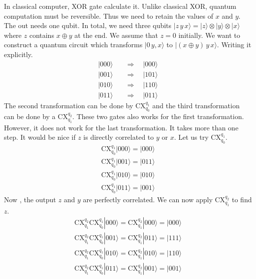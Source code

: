 \documentclass[letterpaper,10pt,english]{jupyterBook}
\begin{document}
\sphinxAtStartPar
In classical computer, XOR gate calculate it. Unlike classical XOR, quantum computation must be reversible.  Thus we need to retain the values of \(x\) and \(y\). The out needs one qubit.  In total, we need three qubits
\(|z\,y\,x\rangle = |z\rangle \otimes |y\rangle \otimes |x\rangle\) where \(z\) contains \(x \oplus y\) at the end.  We assume that \(z=0\) initially.  We want to construct a quantum circuit which transforms \(|0\,y,x\rangle\) to \(|(x \oplus y)\, y\, x\rangle\).  Writing it explicitly.
\begin{align}
|000\rangle \quad &\Rightarrow \quad |000\rangle \\
|001\rangle \quad &\Rightarrow \quad |101\rangle \\
|010\rangle \quad &\Rightarrow \quad |110\rangle \\
|011\rangle \quad &\Rightarrow \quad |011\rangle
\end{align}
\sphinxAtStartPar
The second transformation can be done by CX\(_{q_0}^{q_1}\) and the third transformation can be done by a CX\(_{q_1}^{q_2}\). These two gates also works for the first transformation.  However, it does not work for the last transformation.  It takes more than one step.  It would be nice if \(z\) is directly correlated to \(y\) or \(x\). Let us try CX\(_{q_0}^{q_1}\).
\begin{align}
\text{CX}_{q_0}^{q_1}|000\rangle = |000\rangle \\
\text{CX}_{q_0}^{q_1}|001\rangle = |011\rangle \\
\text{CX}_{q_0}^{q_1}|010\rangle = |010\rangle \\
\text{CX}_{q_0}^{q_1}|011\rangle = |001\rangle
\end{align}
\sphinxAtStartPar
Now , the output \(z\) and \(y\) are perfectly correlated.  We can now apply CX\(_{q_1}^{q_2}\) to find \(z\).
\begin{align}
\text{CX}_{q_1}^{q_2}\text{CX}_{q_0}^{q_1}|000\rangle = \text{CX}_{q_1}^{q_2}|000\rangle = |000\rangle  \\
\text{CX}_{q_1}^{q_2}\text{CX}_{q_0}^{q_1}|001\rangle = \text{CX}_{q_1}^{q_2}|011\rangle = |111\rangle \\
\text{CX}_{q_1}^{q_2}\text{CX}_{q_0}^{q_1}|010\rangle = \text{CX}_{q_1}^{q_2}|010\rangle = |110\rangle \\
\text{CX}_{q_1}^{q_2}\text{CX}_{q_0}^{q_1}|011\rangle = \text{CX}_{q_1}^{q_2}|001\rangle = |001\rangle
\end{align}
\end{document}
